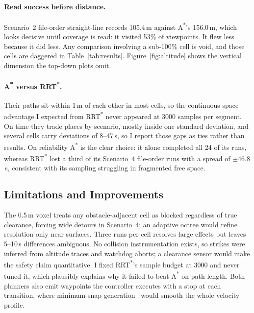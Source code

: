 \documentclass[11pt,a4paper]{article}
\begin{document}
\paragraph{Read success before distance.} Scenario~2 file-order straight-line records 105.4\,m against A\textsuperscript{*}'s 156.0\,m, which looks decisive until coverage is read: it visited 53\% of viewpoints. It flew less because it did less. Any comparison involving a sub-100\% cell is void, and those cells are daggered in Table~\ref{tab:results}. Figure~\ref{fig:altitude} shows the vertical dimension the top-down plots omit.

\paragraph{A\textsuperscript{*} versus RRT\textsuperscript{*}.} Their paths sit within 1\,m of each other in most cells, so the continuous-space advantage I expected from RRT\textsuperscript{*} never appeared at 3000 samples per segment. On time they trade places by scenario, mostly inside one standard deviation, and several cells carry deviations of 8--47\,s, so I report those gaps as ties rather than results. On reliability A\textsuperscript{*} is the clear choice: it alone completed all 24 of its runs, whereas RRT\textsuperscript{*} lost a third of its Scenario~4 file-order runs with a spread of $\pm46.8$\,s, consistent with its sampling struggling in fragmented free space.

\subsection{Limitations and Improvements}

The 0.5\,m voxel treats any obstacle-adjacent cell as blocked regardless of true clearance, forcing wide detours in Scenario~4; an adaptive octree would refine resolution only near surfaces. Three runs per cell resolves large effects but leaves 5--10\,s differences ambiguous. No collision instrumentation exists, so strikes were inferred from altitude traces and watchdog aborts; a clearance sensor would make the safety claim quantitative. I fixed RRT\textsuperscript{*}'s sample budget at 3000 and never tuned it, which plausibly explains why it failed to beat A\textsuperscript{*} on path length. Both planners also emit waypoints the controller executes with a stop at each transition, where minimum-snap generation~\cite{mellinger2011minimum} would smooth the whole velocity profile.

\end{document}
